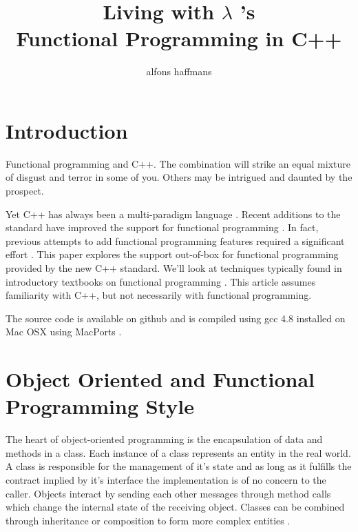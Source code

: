 \documentclass[12pt,fleqn]{article}
\begin{document}
\title{Living  with $\lambda$ 's \\ Functional Programming in C++}
\author {alfons haffmans}
\maketitle

\section* {Introduction}
Functional programming and C++.
The combination will strike an equal mixture of disgust and terror in some of you.
Others may be intrigued and daunted by the prospect.

Yet C++ has always been a multi-paradigm language \cite{stroustrup}.
Recent additions to the standard have improved the support for functional programming \cite{josuttis}.
In fact, previous attempts to add functional programming features required a significant effort \cite{mcnamara}.
This paper explores the support out-of-box for functional programming provided by the new C++ standard.
We'll look at techniques typically found in introductory textbooks on functional programming \cite{lipovaca, hutton, bird}.
This article assumes familiarity with C++, but not necessarily with functional programming.

The source code is available on github \cite{sourcecode} and is compiled using gcc 4.8 installed on Mac OSX using MacPorts \cite{macports}.


\section*{Object Oriented and Functional Programming Style}
The heart of object-oriented programming is the encapsulation of data and methods in a class.
Each instance of a class represents an entity in the real world. 
A class is responsible for the management of it's state and as long as it fulfills the contract implied by it's interface the implementation is of no concern to the caller.
Objects interact by sending each other messages through method calls which change the internal state of the receiving object.
Classes can be combined through inheritance or composition to form more complex entities \cite{designpatterns}. 
\end{document}
